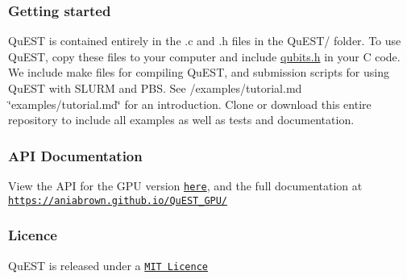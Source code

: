 \subsubsection*{Getting started}

Qu\+E\+ST is contained entirely in the {\ttfamily .c} and {\ttfamily .h} files in the {\ttfamily Qu\+E\+S\+T/} folder. To use Qu\+E\+ST, copy these files to your computer and include {\ttfamily \mbox{\hyperlink{qubits_8h}{qubits.\+h}}} in your C code. We include make files for compiling Qu\+E\+ST, and submission scripts for using Qu\+E\+ST with S\+L\+U\+RM and P\+BS. See /examples/tutorial.md \char`\"{}examples/tutorial.\+md\char`\"{} for an introduction. Clone or download this entire repository to include all examples as well as tests and documentation.

\subsubsection*{A\+PI Documentation}

View the A\+PI for the G\+PU version \href{https://aniabrown.github.io/QuEST_GPU/qubits_8h.html}{\tt here}, and the full documentation at \href{https://aniabrown.github.io/QuEST_GPU/}{\tt https\+://aniabrown.\+github.\+io/\+Qu\+E\+S\+T\+\_\+\+G\+P\+U/}

\subsubsection*{Licence}

Qu\+E\+ST is released under a \href{LICENCE.txt}{\tt M\+IT Licence} 